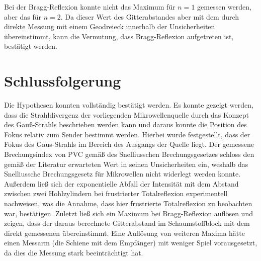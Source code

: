 \documentclass[
	a4paper,
	12pt,
	pagesize,
	ngerman
]{scrartcl}
\begin{document}
	Bei der Bragg-Reflexion konnte nicht das Maximum für $n=1$ gemessen werden, aber das für $n=2$.
	Da dieser Wert des Gitterabstandes aber mit dem durch direkte Messung mit einem Geodreieck innerhalb der Unsicherheiten übereinstimmt, kann die Vermutung, dass Bragg-Reflexion aufgetreten ist, bestätigt werden. 
	 
	
	
	\section{Schlussfolgerung}
	Die Hypothesen konnten vollständig bestätigt werden.
	Es konnte gezeigt werden, dass die Strahldivergenz der vorliegenden Mikrowellenquelle durch das Konzept des Gauß-Strahls beschrieben werden kann und daraus konnte die Position des Fokus relativ zum Sender bestimmt werden. %
	Hierbei wurde festgestellt, dass der Fokus des Gaus-Strahls im Bereich des Ausgangs der Quelle liegt.
	Der gemessene Brechungsindex von PVC gemäß des Snelliusschen Brechungsgesetzes schloss den gemäß der Literatur erwarteten Wert in seinen Unsicherheiten ein, weshalb das Snelliussche Brechungsgesetz für Mikrowellen nicht widerlegt werden konnte.
	Außerdem ließ sich der exponentielle Abfall der Intensität mit dem Abstand zwischen zwei Hohlzylindern bei frustrierter Totalreflexion experimentell nachweisen, was die Annahme, dass hier frustrierte Totalreflexion zu beobachten war, bestätigen.
	Zuletzt ließ sich ein Maximum bei Bragg-Reflexion auflösen und zeigen, dass der daraus berechnete Gitterabstand im Schaumstoffblock mit dem direkt gemessenen übereinstimmt.
	Eine Auflösung von weiteren Maxima hätte einen Messarm (die Schiene mit dem Empfänger) mit weniger Spiel vorausgesetzt, da dies die Messung stark beeinträchtigt hat. %
	
	\printbibliography
\end{document}
